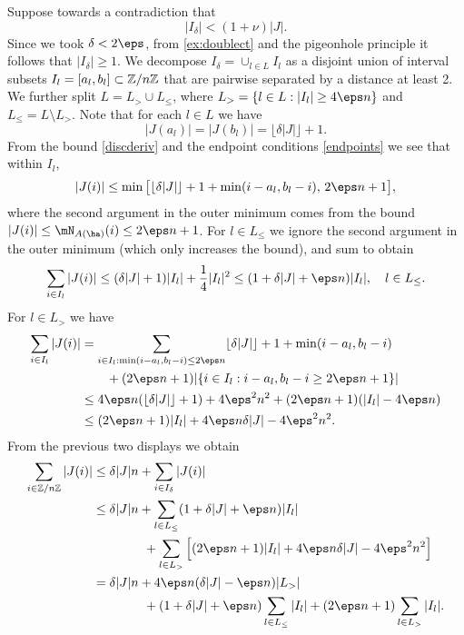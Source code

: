 \documentclass[aop,preprint]{imsart}
\theoremstyle{plain}
\theoremstyle{definition}
\theoremstyle{remark}
\numberwithin{equation}{section}
\numberwithin{theorem}{section}
\def \lf {\lfloor}
\def \rf {\rfloor}
\begin{document}
Suppose towards a contradiction that
\begin{equation}	\label{Ji:suppose}
|I_\delta| <(1+\nu) |J|.
\end{equation}
Since we took $\delta<2\eps$, from \eqref{ex:doublect} and the pigeonhole principle it follows that $|I_\delta|\ge 1$.
We decompose $I_\delta=\cup_{l\in L} I_l$ as a disjoint union of interval subsets $I_l=[a_l,b_l]\subset{\mathbb Z}/n{\mathbb Z}$ that are pairwise separated by a distance at least 2. 
We further split $L=L_>\cup L_\le$, where $L_>= \{l\in L: |I_l|\ge 4\eps n\}$ and $L_\le = L\setminus L_>$.
Note that for each $l\in L$ we have
\begin{equation}	\label{endpoints}
|J(a_l)|=|J(b_l)| = \lf \delta |J|\rf + 1.
\end{equation}
From the bound \eqref{discderiv} and the endpoint conditions \eqref{endpoints} we see that within $I_l$, 
\begin{equation}	\label{Ji.pointwise}
|J(i)|\le \min\big[ \lf \delta |J|\rf + 1+ \min(i-a_l,b_l-i) , \, 2\eps n+1\big],
\end{equation}
where the second argument in the outer minimum comes from the bound $|J(i)| \le \mN_{A(\ha)}(i)\le 2\eps n+1$. 
For $l\in L_\le$ we ignore the second argument in the outer minimum (which only increases the bound), and sum to obtain
\[
\sum_{i\in I_l} |J(i)| \le (\delta|J| +1) |I_l| + \frac14 |I_l|^2 \le (1+\delta |J| + \eps n)|I_l|,\quad l\in L_\le.
\]
For $l\in L_>$ we have
\begin{align*}
\sum_{i\in I_l} |J(i)|  
&=\sum_{i\in I_l: \min(i-a_l,b_l-i)\le 2\eps n} \lf\delta |J|\rf + 1+ \min(i-a_l,b_l-i)\\
&\qquad+ (2\eps n+1) |\{i\in I_l: i-a_l, b_l-i\ge 2\eps n+1\}|\\
&\le 4\eps n (\lf \delta |J|\rf + 1) + 4\eps^2 n^2 + (2\eps n+1) (|I_l| -4\eps n)\\
&\le (2\eps n+1)|I_l| + 4\eps n\delta |J| - 4\eps^2n^2.
\end{align*}
From the previous two displays we obtain
\begin{align*}
\sum_{i\in \Z/n\Z} |J(i)| 
&\le \delta |J| n + \sum_{i\in I_\delta} |J(i)|\\
&\le \delta |J| n + \sum_{l\in L_\le} (1+\delta |J| + \eps n)|I_l| \\
&\qquad \qquad+ \sum_{l\in L_>} \Big[(2\eps n+1)|I_l| + 4\eps n\delta |J| - 4\eps^2 n^2\Big]\\
&= \delta|J|n + 4\eps n(\delta |J|-\eps n)|L_>|\\
&\qquad\qquad+(1+\delta|J|+ \eps n) \sum_{l\in L_\le }|I_l| + (2\eps n+1)\sum_{l\in L_>} |I_l|.
\end{align*}
\end{document}
